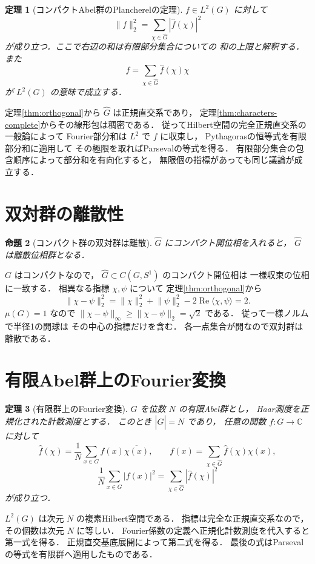 \documentclass[a5paper,10pt,onecolumn]{jsarticle}
\makeatletter
\theoremstyle{mathnotetheorem}
\newtheorem{theorem}{定理}[section]
\newtheorem{proposition}[theorem]{命題}
\renewcommand{\proofname}{証明}
\renewenvironment{proof}[1][\proofname]{%
  \par\pushQED{\qed}\normalfont\topsep4\p@\@plus2\p@\relax
  \trivlist\item[\hskip\labelsep\bfseries #1]\ignorespaces
}{\popQED\endtrivlist\@endpefalse}
\newcommand{\norm}[1]{\lVert #1\rVert}
\makeatother
\begin{document}
\begin{theorem}[コンパクトAbel群のPlancherelの定理]
\label{thm:plancherel}
$f\in L^2(G)$ に対して
\[
 \norm f_2^2=\sum_{\chi\in\widehat G}
 |\widehat f(\chi)|^2
\]
が成り立つ．ここで右辺の和は有限部分集合についての
和の上限と解釈する．
また
\[
 f=\sum_{\chi\in\widehat G}
 \widehat f(\chi)\chi
\]
が $L^2(G)$ の意味で成立する．
\end{theorem}
\begin{proof}
定理\ref{thm:orthogonal}から $\widehat G$ は正規直交系であり，
定理\ref{thm:characters-complete}からその線形包は稠密である．
従ってHilbert空間の完全正規直交系の一般論によって
Fourier部分和は $L^2$ で $f$ に収束し，
Pythagorasの恒等式を有限部分和に適用して
その極限を取ればParsevalの等式を得る．
有限部分集合の包含順序によって部分和を有向化すると，
無限個の指標があっても同じ議論が成立する．
\end{proof}

\section{双対群の離散性}

\begin{proposition}[コンパクト群の双対群は離散]
\label{prop:dual-discrete}
$\widehat G$ にコンパクト開位相を入れると，
$\widehat G$ は離散位相群となる．
\end{proposition}
\begin{proof}
$G$ はコンパクトなので，
$\widehat G\subset C(G,S^1)$ のコンパクト開位相は
一様収束の位相に一致する．
相異なる指標 $\chi,\psi$ について
定理\ref{thm:orthogonal}から
\[
 \norm{\chi-\psi}_2^2
 =\norm\chi_2^2+\norm\psi_2^2
 -2\operatorname{Re}\langle\chi,\psi\rangle
 =2.
\]
$\mu(G)=1$ なので
$\norm{\chi-\psi}_\infty\ge\norm{\chi-\psi}_2=\sqrt2$
である．
従って一様ノルムで半径1の開球は
その中心の指標だけを含む．
各一点集合が開なので双対群は離散である．
\end{proof}

\section{有限Abel群上のFourier変換}

\begin{theorem}[有限群上のFourier変換]
\label{thm:finite-fourier}
$G$ を位数 $N$ の有限Abel群とし，
Haar測度を正規化された計数測度とする．
このとき $|\widehat G|=N$ であり，
任意の関数 $f:G\to\mathbb C$ に対して
\[
 \widehat f(\chi)=\frac1N\sum_{x\in G}
 f(x)\overline{\chi(x)},\qquad
 f(x)=\sum_{\chi\in\widehat G}\widehat f(\chi)\chi(x),
\]
\[
 \frac1N\sum_{x\in G}|f(x)|^2
 =\sum_{\chi\in\widehat G}|\widehat f(\chi)|^2
\]
が成り立つ．
\end{theorem}
\begin{proof}
$L^2(G)$ は次元 $N$ の複素Hilbert空間である．
指標は完全な正規直交系なので，
その個数は次元 $N$ に等しい．
Fourier係数の定義へ正規化計数測度を代入すると
第一式を得る．
正規直交基底展開によって第二式を得る．
最後の式はParsevalの等式を有限群へ適用したものである．
\end{proof}
\end{document}
